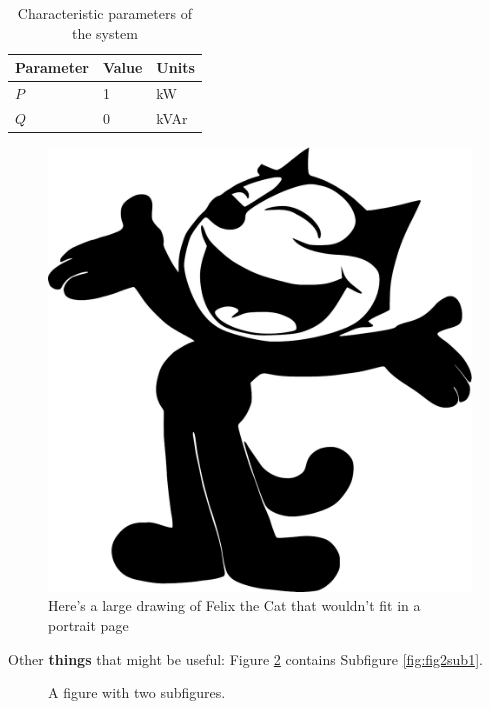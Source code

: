 \begin{table}[htbp]
	\centering
	\begin{tabular}{lll}
		Parameter & Value & Units\\
		\hline
		$P$ & 1 & kW \\
		$Q$ & 0 & kVAr\\
	    \hline
	\end{tabular}
	\caption{Characteristic parameters of the system}
	\label{tab:tab1}
\end{table}

\begin{landscape}
	\begin{figure}[htbp]
\centering
\includegraphics[width=0.5\linewidth]{introduction/fig/Felix_the_cat.pdf}
\caption{Here's a large drawing of Felix the Cat that wouldn't fit in a portrait page}
\label{fig:felix2}
\end{figure}
\end{landscape}

Other \textbf{things} that might be useful:  Figure \ref{fig:fig2} contains Subfigure \ref{fig:fig2sub1}.

\begin{figure}[htbp]
	\centering
	\caption{A figure with two subfigures.}
	\label{fig:fig2}
\end{figure}

